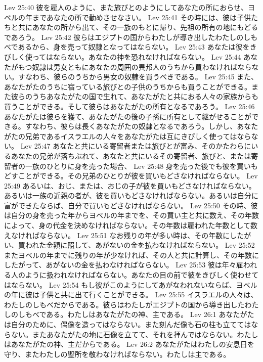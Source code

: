 Lev 25:40  彼を雇人のように、また旅びとのようにしてあなたの所におらせ、ヨベルの年まであなたの所で勤めさせなさい。
Lev 25:41  その時には、彼は子供たちと共にあなたの所から出て、その一族のもとに帰り、先祖の所有の地にもどるであろう。
Lev 25:42  彼らはエジプトの国からわたしが導き出したわたしのしもべであるから、身を売って奴隷となってはならない。
Lev 25:43  あなたは彼をきびしく使ってはならない。あなたの神を恐れなければならない。
Lev 25:44  あなたがもつ奴隷は男女ともにあなたの周囲の異邦人のうちから買わなければならない。すなわち、彼らのうちから男女の奴隷を買うべきである。
Lev 25:45  また、あなたがたのうちに宿っている旅びとの子供のうちからも買うことができる。また彼らのうちあなたがたの国で生れて、あなたがたと共におる人々の家族からも買うことができる。そして彼らはあなたがたの所有となるであろう。
Lev 25:46  あなたがたは彼らを獲て、あなたがたの後の子孫に所有として継がせることができる。すなわち、彼らは長くあなたがたの奴隷となるであろう。しかし、あなたがたの兄弟であるイスラエルの人々をあなたがたは互にきびしく使ってはならない。
Lev 25:47  あなたと共にいる寄留者または旅びとが富み、そのかたわらにいるあなたの兄弟が落ちぶれて、あなたと共にいるその寄留者、旅びと、または寄留者の一族のひとりに身を売った場合、
Lev 25:48  身を売った後でも彼を買いもどすことができる。その兄弟のひとりが彼を買いもどさなければならない。
Lev 25:49  あるいは、おじ、または、おじの子が彼を買いもどさなければならない。あるいは一族の近親の者が、彼を買いもどさなければならない。あるいは自分に富ができたならば、自分で買いもどさなければならない。
Lev 25:50  その時、彼は自分の身を売った年からヨベルの年までを、その買い主と共に数え、その年数によって、身の代金を決めなければならない。その年数は雇われた年数として数えなければならない。
Lev 25:51  なお残りの年が多い時は、その年数にしたがい、買われた金額に照して、あがないの金を払わなければならない。
Lev 25:52  またヨベルの年までに残りの年が少なければ、その人と共に計算し、その年数にしたがって、あがないの金を払わなければならない。
Lev 25:53  彼は年々雇われる人のように扱われなければならない。あなたの目の前で彼をきびしく使わせてはならない。
Lev 25:54  もし彼がこのようにしてあがなわれないならば、ヨベルの年に彼は子供と共に出て行くことができる。
Lev 25:55  イスラエルの人々は、わたしのしもべだからである。彼らはわたしがエジプトの国から導き出したわたしのしもべである。わたしはあなたがたの神、主である。
Lev 26:1  あなたがたは自分のために、偶像を造ってはならない。また刻んだ像も石の柱も立ててはならない。またあなたがたの地に石像を立てて、それを拝んではならない。わたしはあなたがたの神、主だからである。
Lev 26:2  あなたがたはわたしの安息日を守り、またわたしの聖所を敬わなければならない。わたしは主である。
